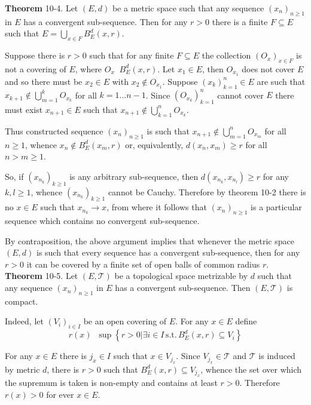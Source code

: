 \documentclass[a4paper]{article}
\newcommand{\obj}[1]{\left\{ #1 \right \}}
\newcommand{\brac}[1]{\left ( #1 \right )}
\newcommand{\induc}[1]{\left . #1 \right \vert}
\newcommand{\Tcal}{\mathcal{T}}
\newcommand{\defn}{\mathop{\overset{\Delta}{=}}\nolimits}
\begin{document}
\label{thm:open_ball_cover} \noindent \textbf{Theorem} 10-4.
Let $\brac{E,d}$ be a metric space such that any sequence $\brac{x_n}_{n\geq 1}$ in $E$ has a convergent sub-sequence. Then for any $r>0$ there is a finite $F\subseteq E$ such that $E=\bigcup_{x\in F} B^d_E\brac{x, r}$.

Suppose there is $r>0$ such that for any finite $F\subseteq E$ the collection $\brac{O_x}_{x\in F}$ is not a covering of $E$, where $O_x\defn B^d_E\brac{x,r}$. Let $x_1\in E$, then $O_{x_1}$ does not cover $E$ and so there must be $x_2\in E$ with $x_2\notin O_{x_1}$. Suppose $\brac{x_k}_{k=1}^n\in E$ are such that $x_{k+1}\notin \bigcup_{m=1}^k O_{x_k}$ for all $k=1\ldots {n-1}$. Since $\brac{O_{x_k}}_{k=1}^n$ cannot cover $E$ there must exist $x_{n+1}\in E$ such that $x_{n+1}\notin \bigcup_{k=1}^n O_{x_k}$.

Thus constructed sequence $\brac{x_n}_{n\geq 1}$ is such that $x_{n+1}\notin \bigcup_{m=1}^n O_{x_m}$ for all $n\geq 1$, whence $x_n\notin B^d_E\brac{x_m,r}$ or, equivalently, $d\brac{x_n, x_m}\geq r$ for all $n>m\geq 1$.

So, if $\brac{x_{n_k}}_{k\geq 1}$ is any arbitrary sub-sequence, then $d\brac{x_{n_k}, x_{n_l}}\geq r$ for any $k, l\geq 1$, whence $\brac{x_{n_k}}_{k\geq 1}$ cannot be Cauchy. Therefore by theorem 10-2 there is no $x\in E$ such that $x_{n_k}\to x$, from where it follows that $\brac{x_n}_{n\geq 1}$ is a particular sequence which contains no convergent sub-sequence.

By contraposition, the above argument implies that whenever the metric space $\brac{E,d}$ is such that every sequence has a convergent sub-sequence, then for any $r>0$ it can be covered by a finite set of open balls of common radius $r$.\\

\label{thm:conv_subseq_compact} \noindent \textbf{Theorem} 10-5.
Let $\brac{E,\Tcal}$ be a topological space metrizable by $d$ such that any sequence $\brac{x_n}_{n\geq 1}$ in $E$ has a convergent sub-sequence. Then $\brac{E, \Tcal}$ is compact.

Indeed, let $\brac{V_i}_{i\in I}$ be an open covering of $E$. For any $x\in E$ define\[r\brac{x}\defn \sup\obj{ \induc{ r > 0 } \exists i\in I\,\text{s.t.}\,B^d_E\brac{x, r}\subseteq V_i }\]

For any $x\in E$ there is $j_x\in I$ such that $x\in V_{j_x}$. Since $V_{j_x}\in \Tcal$ and $\Tcal$ is induced by metric $d$, there is $r>0$ such that $B^d_E\brac{x,r}\subseteq V_{j_x}$, whence the set over which the supremum is taken is non-empty and contains at least $r>0$. Therefore $r\brac{x} > 0$ for ever $x\in E$.
\end{document}
